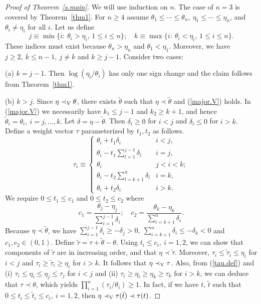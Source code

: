 \documentclass[11pt]{article}
\begin{document}
\begin{proof}[Proof of Theorem~\ref{s.main}]
We will use induction on $n$.  The case of $n=3$ is covered by Theorem~\ref{thm1}.  For $n\geq 4$ assume $\theta_1\leq \cdots\leq \theta_n,\ \eta_1\leq\cdots\leq \eta_n$, and $\theta_i\neq \eta_i$ for all $i$.  Let us define
$$j \equiv \min\{i:\ \theta_i > \eta_i,\, 1\leq i\leq n\};\quad k \equiv \max\{i:\ \theta_i < \eta_i,\, 1\leq i\leq n\}.$$
These indices must exist because $\theta_n>\eta_n$ and $\theta_1<\eta_1$.  Moreover, we have $j \geq 2,\ k\leq n-1,\ j\neq k$ and $k\geq j-1$.  Consider two cases:

(a) $k=j-1$.  Then $\log(\eta_i/\theta_i)$ has only one sign change and the claim follows from Theorem~\ref{thm1}. 

(b) $k > j$.  Since $\eta \prec_{\rm V} \theta$, there exists $\tilde{\theta}$ such that $\eta\prec \tilde{\theta}$ and (\ref{major.V}) holds.  In (\ref{major.V}) we necessarily have $k_1\leq j-1$ and $k_2\geq k+1$, and hence $\tilde{\theta}_i =\theta_i,\ i=j, \ldots, k.$  Let $\delta= \eta -\tilde{\theta}$.  Then $\delta_i\geq 0$ for $i<j$ and $\delta_i \leq 0$ for $i>k$.  Define a weight vector $\tau $ parameterized by $t_1, t_2$ as follows. 
\begin{equation}
\label{tau.def}
\tau_i \equiv \begin{cases} 
\theta_i + t_1 \delta_i & i< j,\\
\theta_i - t_1 \sum_{l=1}^{j-1} \delta_l & i=j,\\
\theta_i & j<i<k;\\
\theta_i - t_2 \sum_{l=k+1}^n \delta_l & i=k,\\
\theta_i + t_2 \delta_i & i> k.
\end{cases}
\end{equation}
We require $0\leq t_1\leq c_1$ and $0\leq t_2\leq c_2$ where 
$$c_1 = \frac{\theta_j - \eta_j}{\sum_{i=1}^{j-1} \delta_i};\quad c_2 = \frac{\theta_k - \eta_k}{\sum_{i=k+1}^{n} \delta_i}.$$
Because $\eta\prec\tilde{\theta}$, we have $\sum_{i=1}^{j-1} \delta_i \geq -\delta_j > 0,\ \sum_{i=k+1}^{n} \delta_i \leq -\delta_k <0$ and $c_1, c_2\in (0, 1)$.  Define $\tilde{\tau} = \tau + \tilde{\theta} - \theta$.  Using $t_i\leq c_i,\ i=1,2$, we can show that components of $\tilde{\tau}$ are in increasing order, and that $\eta\prec \tilde{\tau}$.  Moreover, $\tau_i\leq \tilde{\tau}_i \leq \eta_i$ for $i<j$ and $\tau_i\geq \tilde{\tau}_i \geq \eta_i$ for $i>k$.  It follows that $\eta\prec_{\rm V} \tau$.  Also, from (\ref{tau.def}) and (i) $\tau_i\leq \eta_i \leq \eta_j\leq \tau_j$ for $i<j$ and (ii) $\tau_i\geq \eta_i \geq \eta_k\geq \tau_k$ for $i>k$, we can deduce that $\tau\prec \theta$,  which yields $\prod_{i=1}^n (\tau_i/\theta_i)\geq 1$.  In fact, if we have $t,\, \tilde{t}$ such that $0\leq t_i\leq \tilde{t}_i\leq c_i,\ i=1,2$, then $\eta\prec_{\rm V} \tau(\tilde{t})\prec \tau(t)$. 


\end{proof}
\end{document}
